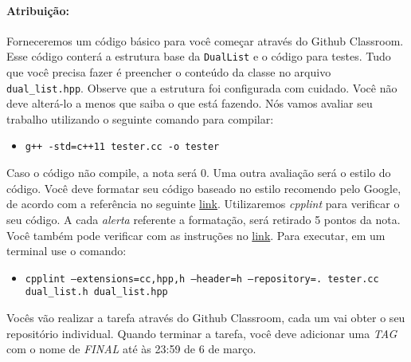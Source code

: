 \documentclass{article}
\begin{document}
\paragraph{Atribuição:} Forneceremos um código básico para você começar através do Github Classroom. Esse código conterá a estrutura base da \texttt{DualList} e o código para testes. Tudo que você precisa fazer é preencher o conteúdo da classe no arquivo \texttt{dual\_list.hpp}. Observe que a estrutura foi configurada com cuidado. Você não deve alterá-lo a menos que saiba o que está fazendo.
%
Nós vamos avaliar seu trabalho utilizando o seguinte comando para compilar:
\begin{itemize}
    \item \texttt{g++ -std=c++11 tester.cc -o tester}
\end{itemize}
Caso o código não compile, a nota será 0.
%
Uma outra avaliação será o estilo do código. Você deve formatar seu código baseado no estilo recomendo pelo  Google, de acordo com a referência no seguinte \href{https://google.github.io/styleguide/cppguide.html}{link}. 
%
Utilizaremos \textit{cpplint} para verificar o seu código. A cada \textit{alerta} referente a formatação, será retirado 5 pontos da nota. Você também pode verificar com as instruções no \href{https://github.com/cpplint/cpplint}{link}. Para executar, em um terminal use o comando:  
\begin{itemize}
    \item \texttt{cpplint --extensions=cc,hpp,h --header=h --repository=. tester.cc dual\_list.h dual\_list.hpp}
\end{itemize}

Vocês vão realizar a tarefa através do Github Classroom, cada um vai obter o seu repositório individual. 
%
Quando terminar a tarefa, você deve adicionar uma \textit{TAG} com o nome de \textit{FINAL} até às 23:59 de 6 de março.
\end{document}
